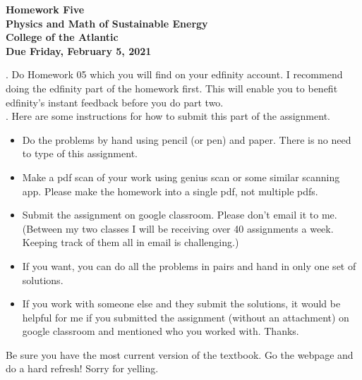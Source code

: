 \documentclass[12pt]{article}
\begin{document}
\pagestyle{empty}
 
\begin{center}
{\LARGE {\bf Homework Five}}\\
\bigskip
{\Large {\bf Physics and Math of Sustainable Energy}}\\
\bigskip
{\Large {\bf College of the Atlantic}}\\
\bigskip
{ {\bf Due Friday, February 5, 2021}}\\ 
\end{center}
\medskip



.  Do Homework 05 which you will find
on your edfinity account.  I recommend doing the edfinity part of the
homework first.  This will enable you to benefit edfinity's instant
feedback before you do part two.\\


.
Here are some 
instructions for how to submit this part of the assignment.
\begin{itemize}
\setlength{\itemsep}{0mm}
\item Do the problems by hand using pencil (or pen) and paper.
  There is no need to type of this assignment.
\item Make a pdf scan of your work using genius scan or some
  similar scanning app.  Please make the homework into a single
  pdf, not multiple pdfs. 
\item Submit the assignment on google classroom.  Please don't
  email it to me.  (Between my two classes I will be receiving
  over 40 assignments a week.  Keeping track of them all in email
  is challenging.)
\item If you want, you can do all the problems in pairs and hand
  in only one set of solutions.
\item If you work with someone else and they submit the solutions, it
  would be helpful for me if you submitted the assignment (without an
  attachment) on google classroom and mentioned who you worked with.
  Thanks. 

\end{itemize}


  Be sure you have the most
current version of the textbook.  Go the webpage and do a hard
refresh!  Sorry for yelling.\\ 
\end{document}
